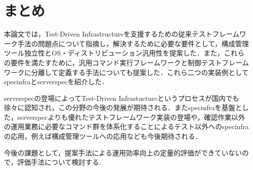 \section{まとめ}

本論文では，Test-Driven Infrastructureを支援するための従来テストフレームワーク手法の問題点について指摘し，解決するために必要な要件として，構成管理ツール独立性とOS・ディストリビューション汎用性を提案した．また，これらの要件を満たすために，汎用コマンド実行フレームワークと制御テストフレームワークに分離して定義する手法についても提案した．これら二つの実装例としてspecinfraとserverspecを紹介した．

serverspecの登場によってTest-Driven Infrastuctureというプロセスが国内でも徐々に認知され，この分野の今後の発展が期待される．またspecinfraを基盤とした，serverspecよりも優れたテストフレームワーク実装の登場や，確認作業以外の運用業務に必要なコマンド群を体系化することによるテスト以外へのspecinfraの応用，例えば構成管理ツールへの応用なども今後期待される．

今後の課題として，提案手法による運用効率向上の定量的評価ができていないので，評価手法について検討する.

